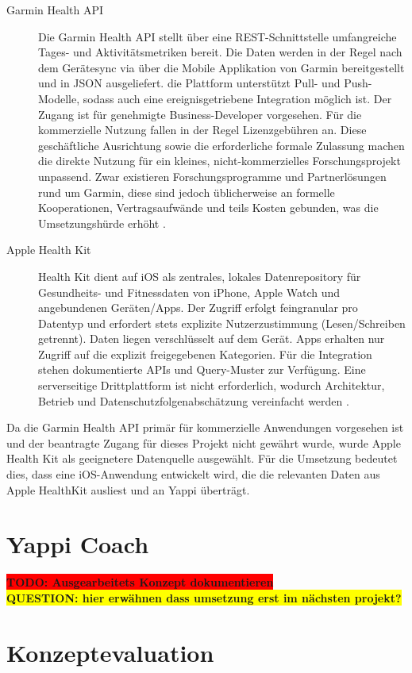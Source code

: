 \documentclass[12pt,a4paper]{report}
\newcommand{\todo}[1]{\colorbox{red}{\textbf{TODO: #1}}\\}
\newcommand{\question}[1]{\colorbox{yellow}{\textbf{QUESTION: #1}}\\}
\begin{document}
\begin{description}
  \item[Garmin Health API] Die Garmin Health API stellt über eine REST-Schnittstelle umfangreiche Tages- und Aktivitätsmetriken 
    bereit. Die Daten werden in der Regel nach dem Gerätesync via über die Mobile Applikation von Garmin bereitgestellt und in
    JSON ausgeliefert. die Plattform unterstützt Pull- und Push-Modelle, sodass auch eine ereignisgetriebene Integration möglich
    ist. Der Zugang ist für genehmigte Business-Developer vorgesehen. Für die kommerzielle Nutzung fallen in der Regel
    Lizenzgebühren an. Diese geschäftliche Ausrichtung sowie die erforderliche formale Zulassung machen die direkte Nutzung für
    ein kleines, nicht-kommerzielles Forschungsprojekt unpassend. Zwar existieren Forschungsprogramme und Partnerlösungen rund um
    Garmin, diese sind jedoch üblicherweise an formelle Kooperationen, Vertragsaufwände und teils Kosten gebunden, was die
    Umsetzungshürde erhöht \cite{garmin_healthapi_2025}.
  \item[Apple Health Kit] Health Kit dient auf iOS als zentrales, lokales Datenrepository für Gesundheits- und Fitnessdaten von 
    iPhone, Apple Watch und angebundenen Geräten/Apps. Der Zugriff erfolgt feingranular pro Datentyp und erfordert stets explizite
    Nutzerzustimmung (Lesen/Schreiben getrennt). Daten liegen verschlüsselt auf dem Gerät. Apps erhalten nur Zugriff auf die
    explizit freigegebenen Kategorien. Für die Integration stehen dokumentierte APIs und Query-Muster zur Verfügung. Eine
    serverseitige Drittplattform ist nicht erforderlich, wodurch Architektur, Betrieb und Datenschutzfolgenabschätzung vereinfacht
    werden \cite{apple_healthkit_2025}.
\end{description}

Da die Garmin Health API primär für kommerzielle Anwendungen vorgesehen ist und der beantragte Zugang für dieses Projekt nicht
gewährt wurde, wurde Apple Health Kit als geeignetere Datenquelle ausgewählt. Für die Umsetzung bedeutet dies, dass eine
iOS-Anwendung entwickelt wird, die die relevanten Daten aus Apple HealthKit ausliest und an Yappi überträgt.

\section{Yappi Coach}
\todo{Ausgearbeitets Konzept dokumentieren}
\question{hier erwähnen dass umsetzung erst im nächsten projekt?}

\section{Konzeptevaluation}
\end{document}

